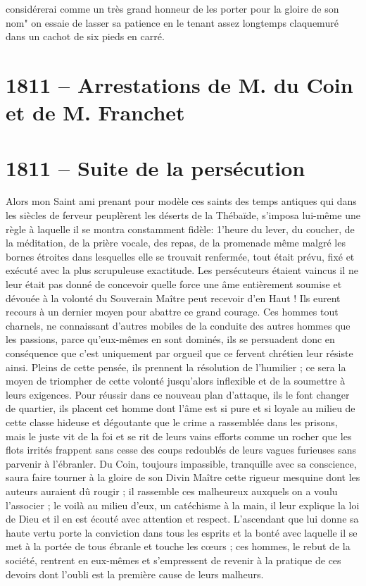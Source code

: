 \documentclass[11pt,a4paper]{report}
\begin{document}
considérerai comme un très grand honneur de les porter pour la gloire de son nom" on essaie de lasser sa patience en le tenant assez longtemps claquemuré dans un cachot de six pieds en carré.

\section*{1811 -- Arrestations de M. du Coin et de M. Franchet}

\section*{1811 -- Suite de la persécution}

Alors mon Saint ami prenant pour modèle ces saints des temps antiques qui dans les siècles de ferveur peuplèrent les déserts de la Thébaïde, s'imposa lui-même une règle à laquelle il se montra constamment fidèle: 1'heure du lever, du coucher, de la méditation, de la prière vocale, des repas, de la promenade même malgré les bornes étroites dans lesquelles elle se trouvait renfermée, tout était prévu, fixé et exécuté avec la plus scrupuleuse exactitude. Les persécuteurs étaient vaincus il ne leur était pas donné de concevoir quelle force une âme entièrement soumise et dévouée à la volonté du Souverain Maître peut recevoir d'en Haut ! Ils eurent recours à un dernier moyen pour abattre ce grand courage. Ces hommes tout charnels, ne connaissant d'autres mobiles de la conduite des autres hommes que les passions, parce qu'eux-mêmes en sont dominés, ils se persuadent donc en conséquence que c'est uniquement par orgueil que ce fervent chrétien leur résiste ainsi. Pleins de cette pensée, ils prennent la résolution de l'humilier ; ce sera la moyen de triompher de cette volonté jusqu'alors inflexible et de la soumettre à leurs exigences. Pour réussir dans ce nouveau plan d'attaque, ils le font changer de quartier, ils placent cet homme dont l'âme est si pure et si loyale au milieu de cette classe hideuse et dégoutante que le crime a rassemblée dans les prisons, mais le juste vit de la foi et se rit de leurs vains efforts comme un rocher que les flots irrités frappent sans cesse des coups redoublés de leurs vagues furieuses sans parvenir à l'ébranler. Du Coin, toujours impassible, tranquille avec sa conscience, saura faire tourner à la gloire de son Divin Maître cette rigueur mesquine dont les auteurs auraient dû rougir ; il rassemble ces malheureux auxquels on a voulu l'associer ; le voilà au milieu d'eux, un catéchisme à la main, il leur explique la loi de Dieu et il en est écouté avec attention et respect. L'ascendant que lui donne sa haute vertu porte la conviction dans tous les esprits et la bonté avec laquelle il se met à la portée de tous ébranle et touche les cœurs ; ces hommes, le rebut de la société, rentrent en eux-mêmes et s'empressent de revenir à la pratique de ces devoirs dont l'oubli est la première cause de leurs malheurs.
\end{document}
